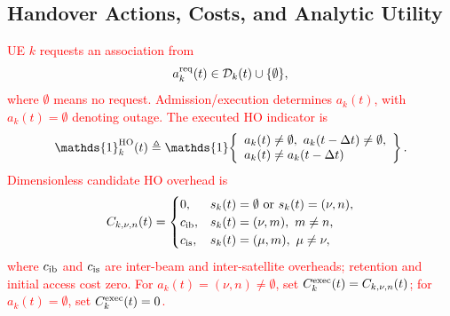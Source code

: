 \documentclass[10pt,letterpaper,journal]{IEEEtran}
\newcommand{\mathbbm}[1]{\mathds{#1}}
\newcommand{\revnew}[1]{\textcolor{red}{#1}}
\begin{document}
\vspace{-2mm}
\subsection{Handover Actions, Costs, and Analytic Utility}
\label{subsec:action_cost}

\textcolor{blue}{\revnew{UE $k$ requests an association from}
\begin{equation}
a_k^{\rm req}(t)\in\mathcal D_k(t)\cup\{\emptyset\},
\label{eq:action_sys_rev}
\end{equation}
\revnew{where $\emptyset$ means no request. Admission/execution determines $a_k(t)$, with $a_k(t)=\emptyset$ denoting outage.}}
\revnew{The executed HO indicator is}
\begin{equation}
\mathbbm{1}_k^{\rm HO}(t)\triangleq
\mathbbm{1}\!\left\{\begin{array}{l}
a_k(t)\neq\emptyset,\ a_k(t-\Delta t)\neq\emptyset,\\
a_k(t)\neq a_k(t-\Delta t)
\end{array}\right\}.
\label{eq:ho_indicator}
\end{equation}
\textcolor{blue}{\revnew{Dimensionless candidate HO overhead is}
\begin{equation}
C_{k,\nu,n}(t)=
\begin{cases}
0,
& s_k(t)=\emptyset \text{ or } s_k(t)=(\nu,n),\\
c_{\rm ib},
& s_k(t)=(\nu,m),\ m\neq n,\\
c_{\rm is},
& s_k(t)=(\mu,m),\ \mu\neq\nu,
\end{cases}    
\end{equation}
\revnew{where $c_{\rm ib}$ and $c_{\rm is}$ are inter-beam and inter-satellite overheads; retention and initial access cost zero. For $a_k(t)=(\nu,n)\neq\emptyset$, set $C_k^{\rm exec}(t)=C_{k,\nu,n}(t)$; for $a_k(t)=\emptyset$, set $C_k^{\rm exec}(t)=0$.}}
\end{document}
